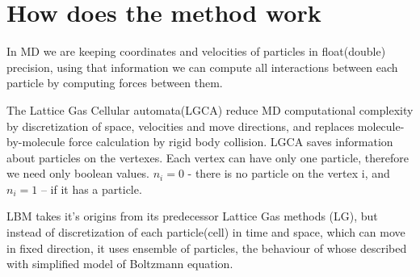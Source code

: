 
\section{How does the method work}
In MD we are keeping coordinates and velocities of particles in float(double) precision, using that information we can compute all interactions between each particle by computing forces between them.

The Lattice Gas Cellular automata(LGCA) reduce MD computational complexity by discretization of space, velocities and move directions, and replaces molecule-by-molecule force calculation by rigid body collision. LGCA saves information about particles on the vertexes. Each vertex can have only one particle, therefore we need only boolean values. $n_i=0$ - there is no particle on the vertex i, and $n_i=1$ – if it has a particle.

LBM takes it's origins from its predecessor Lattice Gas methods (LG), but instead of discretization of each particle(cell) in time and space, which can move in fixed direction, it uses ensemble of particles, the behaviour of whose described with simplified model of Boltzmann equation.